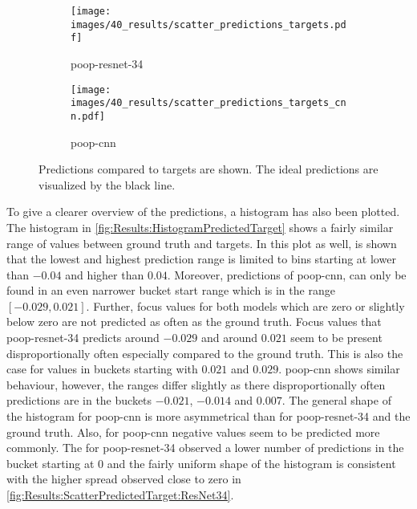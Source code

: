 \begin{figure}
    \centering
    \begin{subfigure}[b]{0.5\textwidth}
        \texttt{[image: images/40\_results/scatter\_predictions\_targets.pdf]}
        \caption{\acs{poop}-\acs{resnet}-34}
        \label{fig:Results:ScatterPredictedTarget:ResNet34}
    \end{subfigure}%
    \begin{subfigure}[b]{0.5\textwidth}
        \texttt{[image: images/40\_results/scatter\_predictions\_targets\_cnn.pdf]}
        \caption{\acs{poop}-\acs{cnn}}
        \label{fig:Results:ScatterPredictedTarget:CNN}
    \end{subfigure}
    \caption[Model predictions compared with targets]{Predictions compared to targets are shown. The ideal predictions are visualized by the black line.}
    \label{fig:Results:ScatterPredictedTarget}
\end{figure}

To give a clearer overview of the predictions, a histogram has also been plotted. The histogram in \autoref{fig:Results:HistogramPredictedTarget} shows a fairly similar range of values between ground truth and targets.
In this plot as well, is shown that the lowest and highest prediction range is limited to bins starting at lower than $-0.04$ and higher than $0.04$. Moreover, predictions of \ac{poop}-\ac{cnn}, can only be found in an even narrower bucket start range which is in the range $[-0.029, 0.021]$. Further, focus values for both models which are zero or slightly below zero are not predicted as often as the ground truth. Focus values that \acs{poop}-\acs{resnet}-34 predicts around $-0.029$ and around $0.021$ seem to be present disproportionally often especially compared to the ground truth. This is also the case for values in buckets starting with $0.021$ and $0.029$. \ac{poop}-\ac{cnn} shows similar behaviour, however, the ranges differ slightly as there disproportionally often predictions are in the buckets $-0.021$, $-0.014$ and $0.007$. The general shape of the histogram for \ac{poop}-\ac{cnn} is more asymmetrical than for \ac{poop}-\acs{resnet}-34  and the ground truth. Also, for \acs{poop}-\acs{cnn} negative values seem to be predicted more commonly. The for \acs{poop}-\acs{resnet}-34 observed a lower number of predictions in the bucket starting at $0$ and the fairly uniform shape of the histogram is consistent with the higher spread observed close to zero in \autoref{fig:Results:ScatterPredictedTarget:ResNet34}. 

